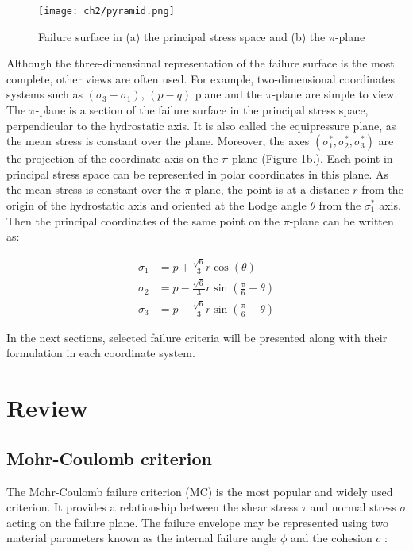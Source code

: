 \begin{figure}[tb]
    \centering
    \texttt{[image: ch2/pyramid.png]}
    \caption{Failure surface in (a) the principal stress space and (b) the $\pi$-plane \cite{Labuz2018}}
    \label{fig2:pyramid}
\end{figure}

Although the three-dimensional representation of the failure surface is the most complete, other views are often used. For example, two-dimensional coordinates systems such as $(\sigma_3 -\sigma_1)$, $(p-q)$ plane and the $\pi$-plane are simple to view. The $\pi$-plane is a section of the failure surface in the principal stress space, perpendicular to the hydrostatic axis. It is also called the equipressure plane, as the mean stress is constant over the plane. Moreover, the axes $(\sigma_1^*,\sigma_2^*,\sigma_3^*)$ are the projection of the coordinate axis on the $\pi$-plane (Figure \ref{fig2:pyramid}b.). Each point in principal stress space can be represented in polar coordinates in this plane. As the mean stress is constant over the $\pi$-plane, the point is at a distance $r$ from the origin of the hydrostatic axis and oriented at the Lodge angle $\theta$ from the  $\sigma_1^*$ axis. Then the principal coordinates of the same point on the $\pi$-plane can be written as: 

\begin{align}
    \sigma_1 &= p + \frac{\sqrt{6}}{3}r\cos\left(\theta\right) \label{eq2:sig1}\\
    \sigma_2 &= p - \frac{\sqrt{6}}{3}r\sin\left(\frac{\pi}{6}-\theta\right)\\
    \sigma_3 &= p - \frac{\sqrt{6}}{3}r\sin\left(\frac{\pi}{6}+\theta\right) \label{eq2:sig3}
\end{align}

In the next sections, selected failure criteria will be presented along with their formulation in each coordinate system. 

\section{Review}
\subsection{Mohr-Coulomb criterion}

The Mohr-Coulomb failure criterion (MC) is the most popular and widely used criterion. It provides a relationship between the shear stress $\tau$ and normal stress $\sigma$ acting on the failure plane. The failure envelope may be represented using two material parameters known as the internal failure angle $\phi$ and the cohesion $c$ :


